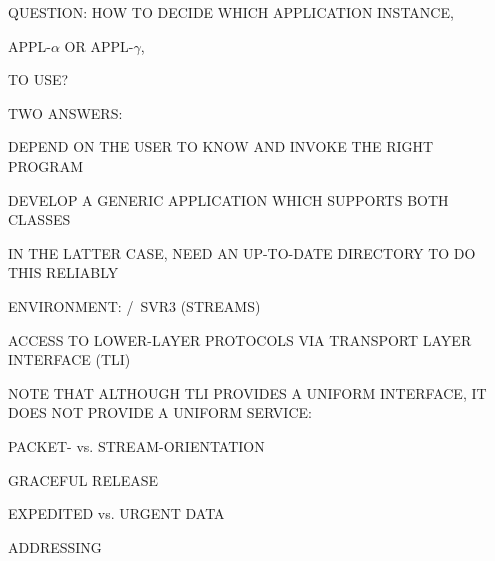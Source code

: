 

\begin{bwslide}

\begin{nrtc}
\item	QUESTION: HOW TO DECIDE WHICH APPLICATION INSTANCE,
    \begin{nrtc}
    \item	APPL-$\alpha$ OR APPL-$\gamma$,
    \end{nrtc}
	TO USE?

\item	TWO ANSWERS:
    \begin{nrtc}
    \item	DEPEND ON THE USER TO KNOW AND INVOKE THE RIGHT PROGRAM

    \item	DEVELOP A GENERIC APPLICATION WHICH SUPPORTS BOTH CLASSES
    \end{nrtc}

\item	IN THE LATTER CASE, NEED AN UP-TO-DATE DIRECTORY TO DO THIS RELIABLY
\end{nrtc}
\end{bwslide}




\begin{bwslide}

\begin{nrtc}
\item	ENVIRONMENT: \unix/~SVR3 (STREAMS)

\item	ACCESS TO LOWER-LAYER PROTOCOLS VIA TRANSPORT LAYER INTERFACE (TLI)

\item	NOTE THAT ALTHOUGH TLI PROVIDES A UNIFORM INTERFACE,
	IT DOES NOT PROVIDE A UNIFORM SERVICE:
    \begin{nrtc}
    \item	PACKET- vs. STREAM-ORIENTATION

    \item	GRACEFUL RELEASE

    \item	EXPEDITED vs. URGENT DATA

    \item	ADDRESSING
    \end{nrtc}
\end{nrtc}
\end{bwslide}


